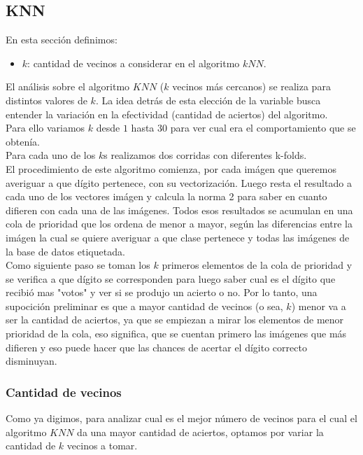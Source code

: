 \subsection{KNN}
En esta sección definimos:
\begin{itemize}
	\item $k$: cantidad de vecinos a considerar en el algoritmo $kNN$.
\end{itemize}
El análisis sobre el algoritmo $KNN$ ($k$ vecinos más cercanos) se realiza para distintos valores de $k$. La idea detrás de esta elección de la variable busca entender la variación en la efectividad (cantidad de aciertos) del algoritmo.
\\
Para ello variamos $k$ desde $1$ hasta $30$ para ver cual era el comportamiento que se obtenía.
\\
Para cada uno de los $k$s realizamos dos corridas con diferentes k-folds.
\\
El procedimiento de este algoritmo comienza, por cada imágen que queremos averiguar a que dígito pertenece, con su vectorización. Luego resta el resultado a cada uno de los vectores imágen y calcula la norma 2 para saber en cuanto difieren con cada una de las imágenes.
Todos esos resultados se acumulan en una cola de prioridad que los ordena de menor a mayor, según las diferencias entre la imágen la cual se quiere averiguar a que clase pertenece y todas las imágenes de la base de datos etiquetada.
\\
Como siguiente paso se toman los $k$ primeros elementos de la cola de prioridad y se verifica a que dígito se corresponden para luego saber cual es el dígito que recibió mas "votos" y ver si se produjo un acierto o no.
Por lo tanto, una supocición preliminar es que a mayor cantidad de vecinos (o sea, $k$) menor va a ser la cantidad de aciertos, ya que se empiezan a mirar los elementos de menor prioridad de la cola, eso significa, que se cuentan primero las imágenes que más difieren y eso puede hacer que las chances de acertar el dígito correcto disminuyan.

\subsubsection{Cantidad de vecinos}
Como ya digimos, para analizar cual es el mejor número de vecinos para el cual el algoritmo $KNN$  da una mayor cantidad de aciertos, optamos por variar la cantidad de $k$ vecinos a tomar.

